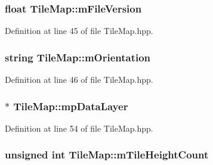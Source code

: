\hypertarget{class_tile_map_a6067e70fab16c65ecbb49ac3a939c2a1}{
\subsubsection[{m\-File\-Version}]{\setlength{\rightskip}{0pt plus 5cm}float Tile\-Map\-::m\-File\-Version\hspace{0.3cm}{\ttfamily [protected]}}}\label{class_tile_map_a6067e70fab16c65ecbb49ac3a939c2a1}


Definition at line 45 of file Tile\-Map.\-hpp.

\hypertarget{class_tile_map_a57c00e3034715bdd4feeb0ea6170829f}{
\subsubsection[{m\-Orientation}]{\setlength{\rightskip}{0pt plus 5cm}string Tile\-Map\-::m\-Orientation\hspace{0.3cm}{\ttfamily [protected]}}}\label{class_tile_map_a57c00e3034715bdd4feeb0ea6170829f}


Definition at line 46 of file Tile\-Map.\-hpp.

\hypertarget{class_tile_map_a8a388c1792d2170c8c5b27098f4ef439}{
\subsubsection[{mp\-Data\-Layer}]{$\ast$ Tile\-Map\-::mp\-Data\-Layer\hspace{0.3cm}{\ttfamily [protected]}}}\label{class_tile_map_a8a388c1792d2170c8c5b27098f4ef439}


Definition at line 54 of file Tile\-Map.\-hpp.

\hypertarget{class_tile_map_a2d6863a88f0ce522376c1d90c448a385}{
\subsubsection[{m\-Tile\-Height\-Count}]{\setlength{\rightskip}{0pt plus 5cm}unsigned int Tile\-Map\-::m\-Tile\-Height\-Count\hspace{0.3cm}{\ttfamily [protected]}}}\label{class_tile_map_a2d6863a88f0ce522376c1d90c448a385}


